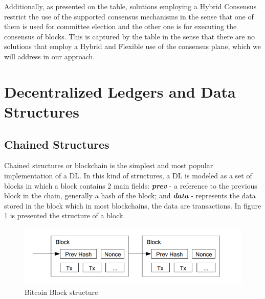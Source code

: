 Additionally, as presented on the table, solutions employing a Hybrid Consensus restrict the use of the supported consensus mechanisms in the sense that one of them is used for committee election and the other one is for executing the consensus of blocks. This is captured by the table in the sense that there are no solutions that employ a Hybrid and Flexible use of the consensus plane, which we will address in our approach.



\section{Decentralized Ledgers and Data Structures}
\label{sec:rel_work:dl_ds}




\subsection{Chained Structures}
\label{subsec:dl_ds:weight_chained_struct}

Chained structures or blockchain is the simplest and most popular implementation of a \gls{DL}. In this kind of structures, a \gls{DL} is modeled as a set of blocks in which a block contains 2 main fields: \textbf{\textit{prev}} - a reference to the previous block in the chain, generally a hash of the block; and \textbf{\textit{data}} - represents the data stored in the block which in most blockchains, the data are transactions. In figure \ref{fig:blockchain-block-struct} is presented the structure of a block.

\begin{figure}[h]
    \centering
    \includegraphics[scale=0.5]{Chapters/Figures/block-struct.png}
    \caption{Bitcoin \cite{bitcoin} Block structure}
    \label{fig:blockchain-block-struct}
\end{figure}


